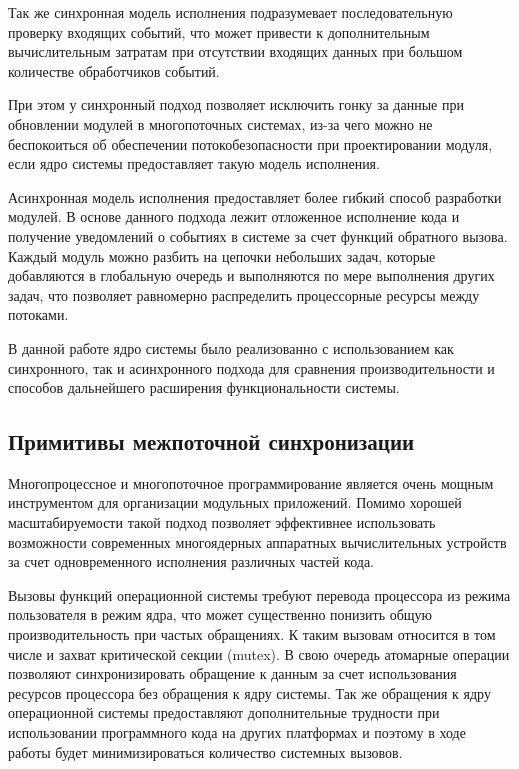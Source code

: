 Так же синхронная модель исполнения подразумевает последовательную проверку входящих событий, что может привести к дополнительным вычислительным затратам при отсутствии входящих данных при большом количестве обработчиков событий.

При этом у синхронный подход позволяет исключить гонку за данные при обновлении модулей в многопоточных системах, из-за чего можно не беспокоиться об обеспечении потокобезопасности при проектировании модуля, если ядро системы предоставляет такую модель исполнения.

Асинхронная модель исполнения предоставляет более гибкий способ разработки модулей. В основе данного подхода лежит отложенное исполнение кода и получение уведомлений о событиях в системе за счет функций обратного вызова. Каждый модуль можно разбить на цепочки небольших задач, которые добавляются в глобальную очередь и выполняются по мере выполнения других задач, что позволяет равномерно распределить процессорные ресурсы между потоками.

В данной работе ядро системы было реализованно с использованием как синхронного, так и асинхронного подхода для сравнения производительности и способов дальнейшего расширения функциональности системы.

\subsection{Примитивы межпоточной синхронизации}

Многопроцессное и многопоточное программирование является очень мощным инструментом для организации модульных приложений. Помимо хорошей масштабируемости такой подход позволяет эффективнее использовать возможности современных многоядерных аппаратных вычислительных устройств за счет одновременного исполнения различных частей кода.

Вызовы функций операционной системы требуют перевода процессора из режима пользователя в режим ядра, что может существенно понизить общую производительность при частых обращениях. К таким вызовам относится в том числе и захват критической секции (mutex). В свою очередь атомарные операции позволяют синхронизировать обращение к данным за счет использования ресурсов процессора без обращения к ядру системы. Так же обращения к ядру операционной системы предоставляют дополнительные трудности при использовании программного кода на других платформах и поэтому в ходе работы будет минимизироваться количество системных вызовов.

